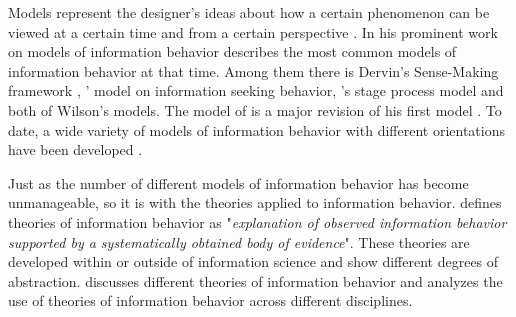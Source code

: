 \documentclass[12pt, a4paper, titlepage, oneside, abstract=true, toc=listof, toc=bibliography, BCOR=1cm]{scrreprt}
\begin{document}
Models represent the designer's ideas about how a certain phenomenon can be viewed at a certain time and from a certain perspective \citep[p. 142]{Ford2015}.  In his prominent work on models of information behavior \citet{Wilson1999} describes the most common models of information behavior at that time. Among them there is Dervin's Sense-Making framework \citep{Dervin2015}, \citet{Ellis1989}' model on information seeking behavior, \citet{Kuhlthau1991}'s stage process model and both of Wilson's models. The model of \citet{Wilson1996} is a major revision of his first model \citep{Wilson1981}. To date, a wide variety of models of information behavior with different orientations have been developed \citep[e.g.][]{Godbold2006, Nesset2014, Robson2013, Shenton2012}. 

Just as the number of different models of information behavior has become unmanageable, so it is with the theories applied to information behavior. \citet[p. 149]{Ford2015} defines theories of information behavior as "\textit{explanation of observed information behavior supported by a systematically obtained body of evidence}". These theories are developed within \citep[e.g.][]{Dervin2015, Fisher2006, Talja2005a, Tuominen2005} or outside \citep[e.g.][]{Dalmer2018, Wilson2006} of information science and show different degrees of abstraction. \citet{Fisher2005} discusses different theories of information behavior and \citet{Wilson2018} analyzes the use of theories of information behavior across different disciplines.
\end{document}
